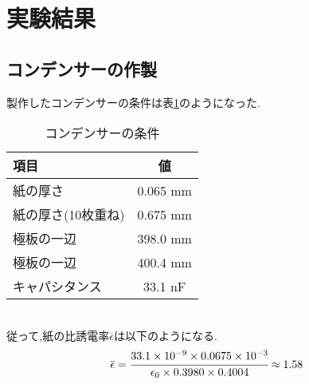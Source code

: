 \section{実験結果}
\subsection{コンデンサーの作製}
製作したコンデンサーの条件は表\ref{tab:capacitor}のようになった.
\begin{table}[htbp]
   \caption{コンデンサーの条件}
   \label{tab:capacitor}
   \centering
   \begin{tabular}{lc}
     \hline
     項目&値\\
     \hline \hline
     紙の厚さ&0.065 \si{\milli\metre}\\
     紙の厚さ(10枚重ね)&0.675 \si{\milli\metre}\\
     極板の一辺&398.0 \si{\milli\metre}\\
     極板の一辺&400.4 \si{\milli\metre}\\
     キャパシタンス&33.1 \si{\nano\farad}\\
     \hline
   \end{tabular}
\end{table}\\
従って,紙の比誘電率$\overline{\epsilon}$は以下のようになる.
\begin{align*}
  \overline{\epsilon}=\cfrac{33.1\times10^{-9}\times0.0675\times10^{-3}}{\epsilon_0\times0.3980\times0.4004}\approx1.58
\end{align*}
